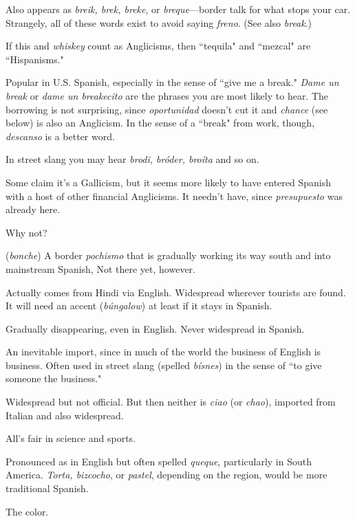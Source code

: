 Also appears as \emph{breik, brek, breke}, or \emph{breque}---border talk for what stops your car. Strangely, all of these words exist to
avoid saying \emph{freno}. (See also \emph{break}.)

 If this and \emph{whiskey} count as Anglicisms, then ``tequila" and ``mezcal" are ``Hispanisms."

 Popular in U.S. Spanish, especially in the sense of ``give
me a break." \emph{Dame un break} or \emph{dame un breakecito} are the phrases
you are most likely to hear. The borrowing is not surprising, since
\emph{oportunidad} doesn't cut it and \emph{chance} (see below) is also an Anglicism.
In the sense of a ``break" from work, though, \emph{descanso} is a better word.

 In street slang you may hear \emph{brodi, bróder, broíta}
and so on.

 Some claim it's a Gallicism, but it seems more
likely to have entered Spanish with a host of other financial Anglicisms. It needn't have, since \emph{presupuesto} was already here.

 Why not?

 (\emph{bonche}) A border \emph{pochismo} that is gradually
working its way south and into mainstream Spanish, Not there yet,
however.

 Actually comes from Hindi via English. Widespread wherever tourists are found. It will need an accent (\emph{búngalow})
at least if it stays in Spanish.

 Gradually disappearing, even in English. Never widespread in Spanish.

 An inevitable import, since in much of the world
the business of English is business. Often used in street slang (spelled
\emph{bísnes}) in the sense of ``to give someone the business."

 Widespread but not official. But then neither is \emph{ciao} (or
\emph{chao}), imported from Italian and also widespread.

 All's fair in science and sports.

 Pronounced as in English but often spelled \emph{queque},
particularly in South America. \emph{Torta, bizcocho}, or \emph{pastel}, depending
on the region, would be more traditional Spanish.

 The color.

